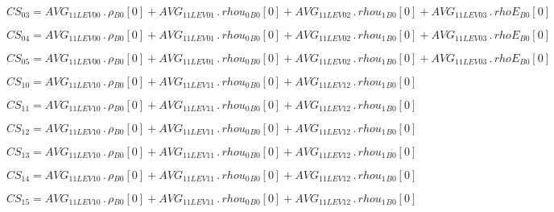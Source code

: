 \documentclass{article}
\begin{document}
\begin{dmath}CS_{03} = AVG_{1 1 LEV 00} \,.\, {\rho{_{B0}}}[{0}] + AVG_{1 1 LEV 01} \,.\, {rhou_{0}{_{B0}}}[{0}] + AVG_{1 1 LEV 02} \,.\, {rhou_{1}{_{B0}}}[{0}] + AVG_{1 1 LEV 03} \,.\, {rhoE{_{B0}}}[{0}]\end{dmath}

\begin{dmath}CS_{04} = AVG_{1 1 LEV 00} \,.\, {\rho{_{B0}}}[{0}] + AVG_{1 1 LEV 01} \,.\, {rhou_{0}{_{B0}}}[{0}] + AVG_{1 1 LEV 02} \,.\, {rhou_{1}{_{B0}}}[{0}] + AVG_{1 1 LEV 03} \,.\, {rhoE{_{B0}}}[{0}]\end{dmath}

\begin{dmath}CS_{05} = AVG_{1 1 LEV 00} \,.\, {\rho{_{B0}}}[{0}] + AVG_{1 1 LEV 01} \,.\, {rhou_{0}{_{B0}}}[{0}] + AVG_{1 1 LEV 02} \,.\, {rhou_{1}{_{B0}}}[{0}] + AVG_{1 1 LEV 03} \,.\, {rhoE{_{B0}}}[{0}]\end{dmath}

\begin{dmath}CS_{10} = AVG_{1 1 LEV 10} \,.\, {\rho{_{B0}}}[{0}] + AVG_{1 1 LEV 11} \,.\, {rhou_{0}{_{B0}}}[{0}] + AVG_{1 1 LEV 12} \,.\, {rhou_{1}{_{B0}}}[{0}]\end{dmath}

\begin{dmath}CS_{11} = AVG_{1 1 LEV 10} \,.\, {\rho{_{B0}}}[{0}] + AVG_{1 1 LEV 11} \,.\, {rhou_{0}{_{B0}}}[{0}] + AVG_{1 1 LEV 12} \,.\, {rhou_{1}{_{B0}}}[{0}]\end{dmath}

\begin{dmath}CS_{12} = AVG_{1 1 LEV 10} \,.\, {\rho{_{B0}}}[{0}] + AVG_{1 1 LEV 11} \,.\, {rhou_{0}{_{B0}}}[{0}] + AVG_{1 1 LEV 12} \,.\, {rhou_{1}{_{B0}}}[{0}]\end{dmath}

\begin{dmath}CS_{13} = AVG_{1 1 LEV 10} \,.\, {\rho{_{B0}}}[{0}] + AVG_{1 1 LEV 11} \,.\, {rhou_{0}{_{B0}}}[{0}] + AVG_{1 1 LEV 12} \,.\, {rhou_{1}{_{B0}}}[{0}]\end{dmath}

\begin{dmath}CS_{14} = AVG_{1 1 LEV 10} \,.\, {\rho{_{B0}}}[{0}] + AVG_{1 1 LEV 11} \,.\, {rhou_{0}{_{B0}}}[{0}] + AVG_{1 1 LEV 12} \,.\, {rhou_{1}{_{B0}}}[{0}]\end{dmath}

\begin{dmath}CS_{15} = AVG_{1 1 LEV 10} \,.\, {\rho{_{B0}}}[{0}] + AVG_{1 1 LEV 11} \,.\, {rhou_{0}{_{B0}}}[{0}] + AVG_{1 1 LEV 12} \,.\, {rhou_{1}{_{B0}}}[{0}]\end{dmath}
\end{document}
